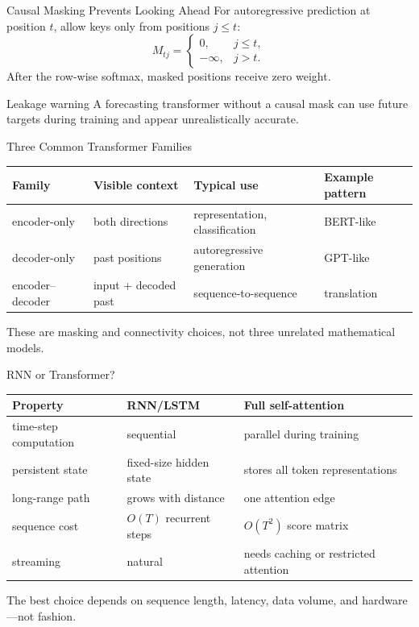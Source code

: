 \documentclass[10pt,aspectratio=169]{ntuabeamer}
\begin{document}
\begin{frame}{Causal Masking Prevents Looking Ahead}
  For autoregressive prediction at position $t$, allow keys only from positions $j\le t$:
  \[
    M_{tj}=\begin{cases}
      0, & j\le t,\\
      -\infty, & j>t.
    \end{cases}
  \]
  After the row-wise softmax, masked positions receive zero weight.
  \begin{alertblock}{Leakage warning}
    A forecasting transformer without a causal mask can use future targets during training and appear unrealistically accurate.
  \end{alertblock}
\end{frame}

\begin{frame}{Three Common Transformer Families}
  \centering
  \small
  \begin{tabular}{llll}
    \toprule
    Family & Visible context & Typical use & Example pattern \\
    \midrule
    encoder-only & both directions & representation, classification & BERT-like \\
    decoder-only & past positions & autoregressive generation & GPT-like \\
    encoder--decoder & input + decoded past & sequence-to-sequence & translation \\
    \bottomrule
  \end{tabular}
  \par
  \vspace{0.45cm}
  These are masking and connectivity choices, not three unrelated mathematical models.
\end{frame}

\begin{frame}{RNN or Transformer?}
  \centering
  \begin{tabular}{lll}
    \toprule
    Property & RNN/LSTM & Full self-attention \\
    \midrule
    time-step computation & sequential & parallel during training \\
    persistent state & fixed-size hidden state & stores all token representations \\
    long-range path & grows with distance & one attention edge \\
    sequence cost & $O(T)$ recurrent steps & $O(T^2)$ score matrix \\
    streaming & natural & needs caching or restricted attention \\
    \bottomrule
  \end{tabular}
  \par
  \vspace{0.4cm}
  The best choice depends on sequence length, latency, data volume, and hardware—not fashion.
\end{frame}
\end{document}
